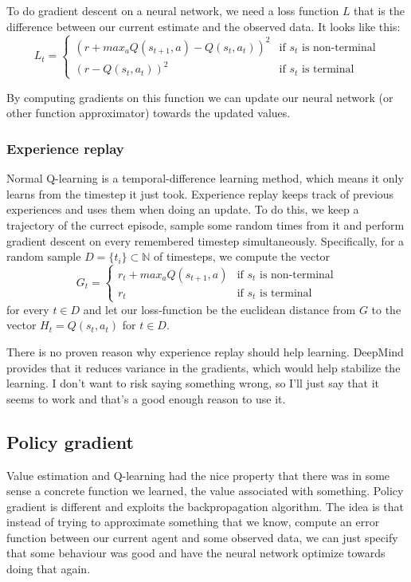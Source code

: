 \documentclass{article}
\theoremstyle{changedot}
\theoremstyle{changedotbreak}
\theoremstyle{nonumberplain}
\begin{document}
To do gradient descent on a neural network, we need a loss function $L$ that is the difference between our current estimate and the observed data. It looks like this:
\[L_{t} = \begin{cases}
    \left( r + max_{a} Q(s_{t+1}, a) - Q(s_{t}, a_{t}) \right)^{2} & \text{if $s_{t}$ is non-terminal} \\
    (r - Q(s_{t}, a_{t}))^{2} & \text{if $s_{t}$ is terminal}
  \end{cases}\]

By computing gradients on this function we can update our neural network (or other function approximator) towards the updated values.

\subsubsection{Experience replay}
Normal Q-learning is a temporal-difference learning method, which means it only learns from the timestep it just took. Experience replay keeps track of previous experiences and uses them when doing an update. To do this, we keep a trajectory of the currect episode, sample some random times from it and perform gradient descent on every remembered timestep simultaneously. Specifically, for a random sample $D = \{t_{i}\} \subset \mathbb N$ of timesteps, we compute the vector
\[G_{t} =  \begin{cases}
    r_{t} + max_{a} Q(s_{t+1}, a) & \text{if $s_{t}$ is non-terminal} \\
    r_{t} & \text{if $s_{t}$ is terminal}
  \end{cases} \]
for every $t \in D$ and let our loss-function be the euclidean distance from $G$ to the vector $H_{t} = Q(s_{t}, a_{t})$ for $t \in D$.

There is no proven reason why experience replay should help learning. DeepMind provides that it reduces variance in the gradients, which would help stabilize the learning. I don't want to risk saying something wrong, so I'll just say that it seems to work and that's a good enough reason to use it.

\subsection{Policy gradient}
Value estimation and Q-learning had the nice property that there was in some sense a concrete function we learned, the value associated with something. Policy gradient is different and exploits the backpropagation algorithm. The idea is that instead of trying to approximate something that we know, compute an error function between our current agent and some observed data, we can just specify that some behaviour was good and have the neural network optimize towards doing that again.
\end{document}
